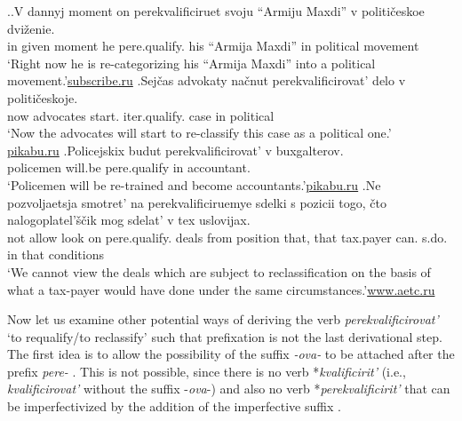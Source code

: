 \ex.\label{ex:qualify}\ag.\label{ex:qualify1}V dannyj moment on perekvalificiruet\textsuperscript{\IPF} svoju {``Armiju Maxdi''} v politi\v{c}eskoe dvi\v{z}enie.\\
in given moment he pere.qualify. his {``Armija Maxdi''} in political movement\\
\trans `Right now he is re-categorizing his ``Armija Maxdi'' into a political movement.'\hbox{}\hfill\hbox{\url{subscribe.ru}}
\bg.\label{ex:qualify2}Sej\v{c}as advokaty na\v{c}nut perekvalificirovat'\textsuperscript{\IPF} delo v politi\v{c}eskoje.\\
now advocates start. iter.qualify. case in political\\
\trans `Now the advocates will start to re-classify this case as a political one.'\\\hbox{}\hfill\hbox{\url{pikabu.ru}}
\bg.\label{ex:qualify3}Policejskix budut perekvalificirovat'\textsuperscript{\IPF} v buxgalterov.\\	
policemen will.be pere.qualify in accountant.\\
\trans `Policemen will be re-trained and become accountants.'\hbox{}\hfill\hbox{\url{pikabu.ru}}
\bg.\label{ex:qualify4}Ne pozvoljaetsja smotret’ na perekvalificiruemye sdelki s pozicii togo, \v{c}to nalogoplatel’\v{s}\v{c}ik mog sdelat’ v tex uslovijax.\\
not allow look on pere.qualify. deals from position that, that tax.payer can. s.do. in that conditions\\
\trans `We cannot view the deals which are subject to reclassification on the basis of what a tax-payer would have done under the same circumstances.'\hbox{}\hfill\hbox{\url{www.aetc.ru}}

Now let us examine other potential ways of deriving the verb \textit{perekvalificirovat'} `to requalify/to reclassify' such that prefixation  is not the last derivational step. The first idea is to allow the possibility of the suffix \textit{-ova-}   to be attached after the prefix \textit{pere-}  . This is not possible, since there is no verb *\textit{kvalificirit'} (i.e., \textit{kvalificirovat'} without the suffix -\textit{ova}-) and also no verb  *\textit{perekvalificirit'} that can be imperfectivized by the addition of the imperfective suffix  .

